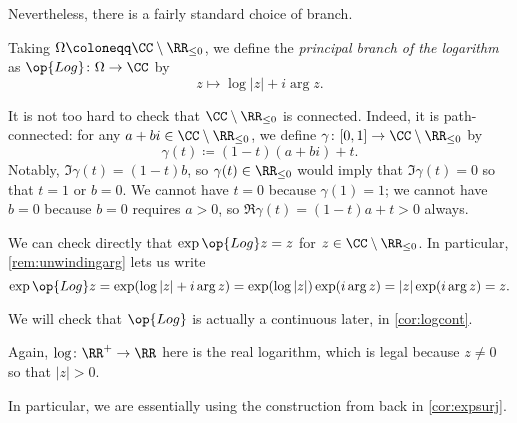 \documentclass[../notes.tex]{subfiles}
\begin{document}
Nevertheless, there is a fairly standard choice of branch.
\begin{defihelper} 
	Taking $\Omega\coloneqq \CC\setminus\RR_{\le0}$, we define the \textit{principal branch of the logarithm} as $\op{Log}\colon \Omega\to\CC$ by
	\[z\mapsto\log|z|+i\arg z.\]
\end{defihelper}
\begin{remark} \label{rem:checkconnected}
	It is not too hard to check that $\CC\setminus\RR_{\le0}$ is connected. Indeed, it is path-connected: for any $a+bi\in\CC\setminus\RR_{\le0}$, we define $\gamma\colon [0,1]\to\CC\setminus\RR_{\le0}$ by
	\[\gamma(t)\coloneqq (1-t)(a+bi)+t.\]
	Notably, $\Im\gamma(t)=(1-t)b$, so $\gamma(t)\in\RR_{\le0}$ would imply that $\Im\gamma(t)=0$ so that $t=1$ or $b=0$. We cannot have $t=0$ because $\gamma(1)=1$; we cannot have $b=0$ because $b=0$ requires $a>0$, so $\Re\gamma(t)=(1-t)a+t>0$ always.
\end{remark}
\begin{remark} \label{rem:checklogisinverse}
	We can check directly that $\exp\op{Log}z=z$ for $z\in\CC\setminus\RR_{\le0}$. In particular, \autoref{rem:unwindingarg} lets us write
	\[\exp\op{Log}z=\exp(\log|z|+i\arg z)=\exp(\log|z|)\exp(i\arg z)=|z|\exp(i\arg z)=z.\]
\end{remark}
We will check that $\op{Log}$ is actually a continuous later, in \autoref{cor:logcont}.
\begin{remark}
	Again, $\log\colon \RR^+\to\RR$ here is the real logarithm, which is legal because $z\ne0$ so that $|z|>0$.
\end{remark}
In particular, we are essentially using the construction from back in \autoref{cor:expsurj}.
\end{document}

